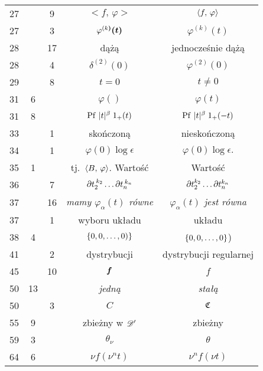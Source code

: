 \documentclass[a4paper,11pt]{article}
\begin{document}
\begin{center}
\begin{tabular}{|c|c|c|c|c|}
    27  & &  9 & $< f,\, \varphi >$ & $\langle  f ,\,  \varphi  \rangle$ \\
    27  & &  3 & $\varphi^{ ( k \boldsymbol{ ) } }\boldsymbol{ ( t ) } $
           & $\varphi^{ ( k ) }( t )$ \\
    28  & & 17 & dążą & jednocześnie dążą \\
    28  & &  4 & $\delta^{ ( 2 ) }( 0 )$ & $\varphi^{ ( 2 ) }( 0 )$ \\
    29  & &  8 & $t = 0$ & $t \neq 0$ \\
    31  &  6 & & $\varphi( )$ & $\varphi( t )$ \\
    31  &  8 & & $\mathrm{Pf}\, \, | t |^{ \beta } \; 1_{ + }( t )$
           & $\mathrm{Pf}\, \, | t |^{ \beta } \; 1_{ + }( -t )$ \\
    33  & &  1 & skończoną & nieskończoną \\
    34  & &  1 & $\varphi( 0 ) \log\epsilon$ & $\varphi( 0 ) \log \epsilon.$ \\
    35  &  1 & & tj.~$\langle  B ,\,  \varphi  \rangle$. Wartość & Wartość \\
    36  & &  7 & $\partial t_{ 2 }^{ \: k_{ 2 } } \ldots \partial t_{ n }^{ \: k_{ n } }$
           & $\partial t_{ 2 }^{ k_{ 2 } } \ldots \partial t_{ n }^{ k_{ n } }$ \\
    37  & & 16 & \emph{mamy $\varphi_{ \alpha }( t )$ równe}
           & \emph{$\varphi_{ \alpha }( t )$ jest równa} \\
    37  & &  1 & wyboru układu & układu \\
    38  &  4 & & $\{ 0, 0, \ldots, 0 ) \}$ & $\{ 0, 0, \ldots, 0 \}$) \\
    41  & &  2 & dystrybucji & dystrybucji regularnej \\
    45  & & 10 & $\boldsymbol{f}$ & $f$ \\
    50  & 13 & & \emph{jedną} & \emph{stałą} \\
    50  & &  3 & $C$ & $\mathfrak{C}$ \\
    55  &  9 & & zbieżny w $\mathcal{D}'$ & zbieżny \\
    59  &  3 & & $\theta_{ \nu }$ & $\theta$ \\
    64  &  6 & & $\nu f( \nu^{ n } t )$ & $\nu^{ n } f( \nu t )$ \\
    \hline
  \end{tabular}
\end{center}
\end{document}
